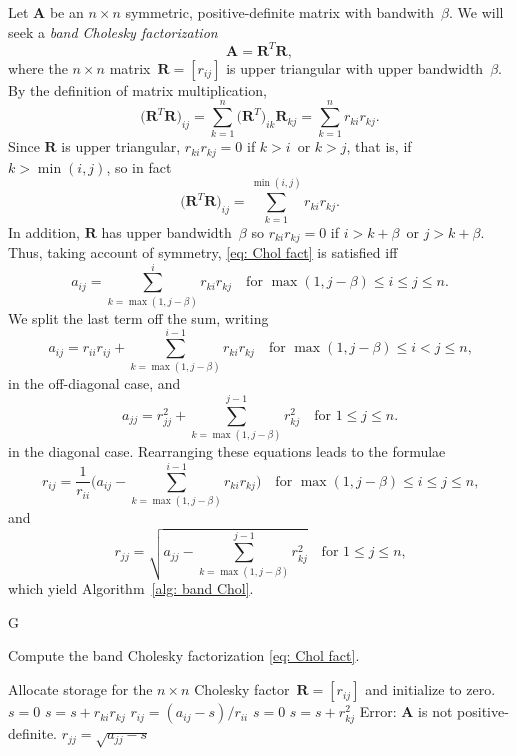 Let $\boldsymbol{A}$ be an $n\times n$ symmetric, positive-definite matrix
with bandwith~$\beta$.  We will seek a \emph{band Cholesky factorization}
\begin{equation}\label{eq: Chol fact}
\boldsymbol{A}=\boldsymbol{R}^T\boldsymbol{R},
\end{equation}
where the $n\times n$ matrix~$\boldsymbol{R}=[r_{ij}]$ is upper triangular with 
upper bandwidth~$\beta$.  By the definition of matrix multiplication,
\[
\bigl(\boldsymbol{R}^T\boldsymbol{R}\bigr)_{ij}
	=\sum_{k=1}^n\bigl(\boldsymbol{R}^T\bigr)_{ik}\boldsymbol{R}_{kj}
	=\sum_{k=1}^n r_{ki}r_{kj}.
\]
Since $\boldsymbol{R}$ is upper triangular, $r_{ki}r_{kj}=0$ if $k>i$~or $k>j$,
that is, if $k>\min(i,j)$, so in fact
\[
\bigl(\boldsymbol{R}^T\boldsymbol{R}\bigr)_{ij}
	=\sum_{k=1}^{\min(i,j)} r_{ki}r_{kj}.
\]
In addition, $\boldsymbol{R}$ has upper bandwidth~$\beta$ so $r_{ki}r_{kj}=0$ 
if $i>k+\beta$~or $j>k+\beta$.  Thus, taking account of symmetry, 
\eqref{eq: Chol fact} is satisfied iff
\[
a_{ij}=\sum_{k=\max(1,j-\beta)}^ir_{ki}r_{kj}
	\quad\text{for $\max(1,j-\beta)\le i\le j\le n$.}
\]
We split the last term off the sum, writing
\[
a_{ij}=r_{ii}r_{ij}+\sum_{k=\max(1,j-\beta)}^{i-1}r_{ki}r_{kj}
	\quad\text{for $\max(1,j-\beta)\le i<j\le n$,}
\]
in the off-diagonal case, and
\[
a_{jj}=r_{jj}^2+\sum_{k=\max(1,j-\beta)}^{j-1}r_{kj}^2
	\quad\text{for $1\le j\le n$.}
\]
in the diagonal case.  Rearranging these equations leads to the formulae
\[
r_{ij}=\frac{1}{r_{ii}}\biggl(a_{ij}-\sum_{k=\max(1,j-\beta)}^{i-1}r_{ki}r_{kj}
	\biggr)\quad\text{for $\max(1,j-\beta)\le i\le j\le n$,}
\]
and
\[
r_{jj}=\sqrt{a_{jj}-\sum_{k=\max(1,j-\beta)}^{j-1}r_{kj}^2}
	\quad\text{for $1\le j\le n$,}
\]
which yield Algorithm~\ref{alg: band Chol}.

\begin{algorithm}
G\caption{Compute the band Cholesky factorization \eqref{eq: Chol fact}.}
\label{alg: band Chol}
\begin{algorithmic}
\State
{}
\State Allocate storage for the $n\times n$ Cholesky 
factor~$\boldsymbol{R}=[r_{ij}]$ and initialize to zero.
        \State $s=0$
            \State $s=s+r_{ki}r_{kj}$
        \EndFor
        \State $r_{ij}=(a_{ij}-s)/r_{ii}$
    \EndFor
    \State $s=0$
        \State $s=s+r_{kj}^2$
    \EndFor
        \State Error: $\boldsymbol{A}$ is not positive-definite.
    \EndIf
    \State $r_{jj}=\sqrt{a_{jj}-s}$
\EndFor
\State{}
\EndFunction
\end{algorithmic}
\end{algorithm}

